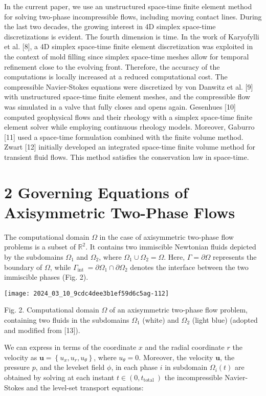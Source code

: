 \documentclass[10pt]{article}
\begin{document}
In the current paper, we use an unstructured space-time finite element method for solving two-phase incompressible flows, including moving contact lines. During the last two decades, the growing interest in 4D simplex space-time discretizations is evident. The fourth dimension is time. In the work of Karyofylli et al. [8], a 4D simplex space-time finite element discretization was exploited in the context of mold filling since simplex space-time meshes allow for temporal refinement close to the evolving front. Therefore, the accuracy of the computations is locally increased at a reduced computational cost. The compressible Navier-Stokes equations were discretized by von Danwitz et al. [9] with unstructured space-time finite element meshes, and the compressible flow was simulated in a valve that fully closes and opens again. Gesenhues [10] computed geophysical flows and their rheology with a simplex space-time finite element solver while employing continuous rheology models. Moreover, Gaburro [11] used a space-time formulation combined with the finite volume method. Zwart [12] initially developed an integrated space-time finite volume method for transient fluid flows. This method satisfies the conservation law in space-time.

\section*{2 Governing Equations of Axisymmetric Two-Phase Flows}
The computational domain $\Omega$ in the case of axisymmetric two-phase flow problems is a subset of $\mathbb{R}^{2}$. It contains two immiscible Newtonian fluids depicted by the subdomains $\Omega_{1}$ and $\Omega_{2}$, where $\Omega_{1} \cup \Omega_{2}=\Omega$. Here, $\Gamma=\partial \Omega$ represents the boundary of $\Omega$, while $\Gamma_{\text {int }}=\partial \Omega_{1} \cap \partial \Omega_{2}$ denotes the interface between the two immiscible phases (Fig. 2).

\begin{center}
\texttt{[image: 2024\_03\_10\_9cdc4dee3b1ef59d6c5ag-112]}
\end{center}

Fig. 2. Computational domain $\Omega$ of an axisymmetric two-phase flow problem, containing two fluids in the subdomains $\Omega_{1}$ (white) and $\Omega_{2}$ (light blue) (adopted and modified from [13]).

We can express in terms of the coordinate $x$ and the radial coordinate $r$ the velocity as $\boldsymbol{u}=\left\{u_{x}, u_{r}, u_{\theta}\right\}$, where $u_{\theta}=0$. Moreover, the velocity $\boldsymbol{u}$, the pressure $p$, and the levelset field $\phi$, in each phase $i$ in subdomain $\Omega_{i}(t)$ are obtained by solving at each instant $t \in\left(0, t_{\text {total }}\right)$ the incompressible Navier-Stokes and the level-set transport equations:
\end{document}
